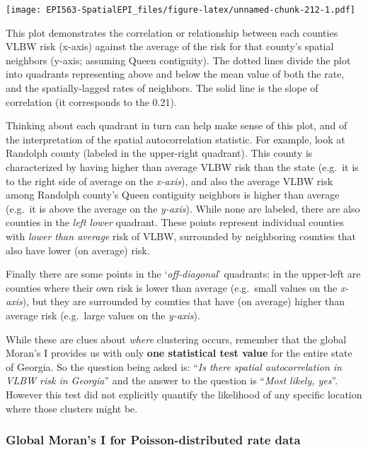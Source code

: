 \documentclass[
]{book}
\begin{document}
\texttt{[image: EPI563-SpatialEPI\_files/figure-latex/unnamed-chunk-212-1.pdf]}

This plot demonstrates the correlation or relationship between each counties VLBW risk (x-axis) against the average of the risk for that county's spatial neighbors (y-axis; assuming Queen contiguity). The dotted lines divide the plot into quadrants representing above and below the mean value of both the rate, and the spatially-lagged rates of neighbors. The solid line is the slope of correlation (it corresponds to the 0.21).

Thinking about each quadrant in turn can help make sense of this plot, and of the interpretation of the spatial autocorrelation statistic. For example, look at Randolph county (labeled in the upper-right quadrant). This county is characterized by having higher than average VLBW risk than the state (e.g.~it is to the right side of average on the \emph{x-axis}), and also the average VLBW risk among Randolph county's Queen contiguity neighbors is higher than average (e.g.~it is above the average on the \emph{y-axis}). While none are labeled, there are also counties in the \emph{left lower} quadrant. These points represent individual counties with \emph{lower than average} risk of VLBW, surrounded by neighboring counties that also have lower (on average) risk.

Finally there are some points in the `\emph{off-diagonal}' quadrants: in the upper-left are counties where their own risk is lower than average (e.g.~small values on the \emph{x-axis}), but they are surrounded by counties that have (on average) higher than average risk (e.g.~large values on the \emph{y-axis}).

While these are clues about \emph{where} clustering occurs, remember that the global Moran's I provides us with only \textbf{one statistical test value} for the entire state of Georgia. So the question being asked is: ``\emph{Is there spatial autocorrelation in VLBW risk in Georgia}'' and the answer to the question is ``\emph{Most likely, yes}''. However this test did not explicitly quantify the likelihood of any specific location where those clusters might be.

\hypertarget{global-morans-i-for-poisson-distributed-rate-data}{%
\subsubsection{Global Moran's I for Poisson-distributed rate data}\label{global-morans-i-for-poisson-distributed-rate-data}}
\end{document}
